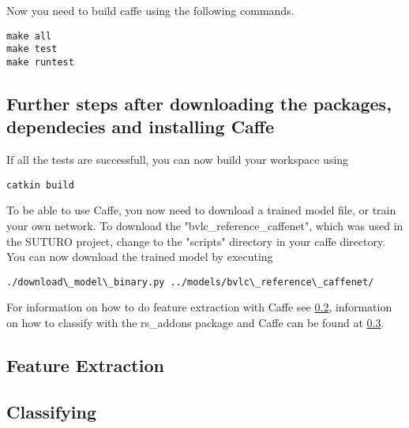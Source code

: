 \documentclass[main.tex]{subfiles}
\begin{document}
 	
Now you need to build caffe using the following commands.
\begin{lstlisting}
make all
make test
make runtest  
\end{lstlisting}

\subsection{Further steps after downloading the packages, dependecies and installing Caffe}

If all the tests are successfull, you can now build your workspace using
\begin{lstlisting}
catkin build
\end{lstlisting}

To be able to use Caffe, you now need to download a trained model file, or train your own network. To download the "bvlc\_reference\_caffenet", which was used in the SUTURO project, change to the "scripts" directory in your caffe directory. You can now download the trained model by executing

\begin{lstlisting}
./download\_model\_binary.py ../models/bvlc\_reference\_caffenet/
\end{lstlisting}

For information on how to do feature extraction with Caffe see \ref{feature_extraction}, information on how to classify with the rs\_addons package and Caffe can be found at \ref{classifying}. 

\subsection{Feature Extraction} \label{feature_extraction}

\subsection{Classifying} \label{classifying}
 
\end{document}
